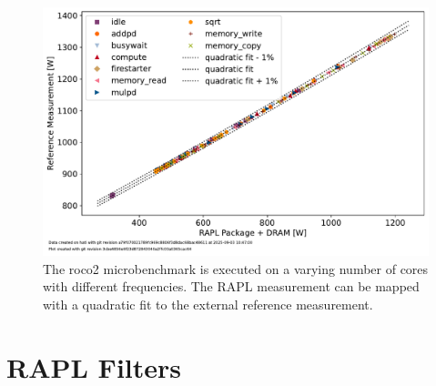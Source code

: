 \begin{figure}[]
    \centering
    \includegraphics[width=0.8\columnwidth]{fig/rapl-accuracy/rapl-accuracy.pdf}
    \caption{\label{fig:validate-rapl}The roco2 microbenchmark is executed on a varying number of cores with different frequencies.
    The RAPL measurement can be mapped with a quadratic fit to the external reference measurement.}
\end{figure}

\section{RAPL Filters}

